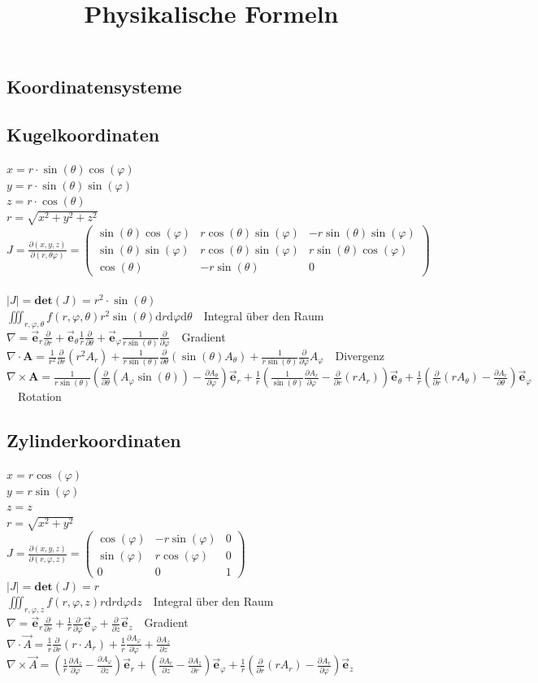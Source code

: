 \documentclass[8pt,a4paper]{extarticle}
\newcommand{\frml}[2]{$#1$~\hfill~#2\\}
\newcommand{\pder}[2]{\frac{\partial#1}{\partial#2}}
\newcommand{\unitv}[1]{\vec{\mathbf{e}}_{#1}}
\begin{document}
\raggedright
\begin{multicols}{3}
\title{Physikalische Formeln}
\section{Koordinatensysteme}
\subsection{Kugelkoordinaten}
\frml{x = r\cdot\sin(\theta)\cos(\varphi)}{}
\frml{y = r\cdot\sin(\theta)\sin(\varphi)}{}
\frml{z = r\cdot\cos(\theta)}{}
\frml{r = \sqrt{x^2+y^2+z^2}}{}
\frml{J = \frac{\partial(x,y,z)}{\partial(r,\theta\varphi)} =
	\begin{pmatrix}
		\sin(\theta)\cos(\varphi) & r\cos(\theta)\sin(\varphi) & -r\sin(\theta)\sin(\varphi) \\
		\sin(\theta)\sin(\varphi) & r\cos(\theta)\sin(\varphi) &  r\sin(\theta)\cos(\varphi) \\
		\cos(\theta) & -r\sin(\theta) & 0
	\end{pmatrix}
}{}
\frml{\left| J \right| = \mathbf{det}(J) = r^2\cdot\sin(\theta)}{}
\frml{\iiint_{r,\varphi,\theta}f(r,\varphi,\theta)r^2\sin(\theta)\mathrm{d}r\mathrm{d}\varphi\mathrm{d}\theta}{Integral \"uber den Raum}
\frml{\nabla = \unitv{r}\pder{}{r}+\unitv{\theta}\frac{1}{r}\pder{}{\theta}+\unitv{\varphi}\frac{1}{r\sin(\theta)}\pder{}{\varphi}}{Gradient}
\frml{\nabla \cdot \mathbf{A} = \frac{1}{r^2}\pder{}{r}(r^2A_r)+\frac{1}{r\sin(\theta)}\pder{}{\theta}(\sin(\theta)A_\theta)+\frac{1}{r\sin(\theta)}\pder{}{\varphi}A_\varphi}{Divergenz}
\frml{\nabla \times \mathbf{A} = \frac{1}{r\sin(\theta)}\left(\pder{}{\theta}(A_\varphi\sin(\theta))-\pder{A_\theta}{\varphi}\right)\unitv{r}+\frac{1}{r}\left(\frac{1}{\sin(\theta)}\pder{A_r}{\varphi}-\pder{}{r}\left(rA_r\right)\right)\unitv{\theta}+\frac{1}{r}\left(\pder{}{r}\left(rA_\theta\right)-\pder{A_r}{\theta}\right)\unitv{\varphi}}{Rotation}
\subsection{Zylinderkoordinaten}
\frml{x = r\cos(\varphi)}{}
\frml{y = r\sin(\varphi)}{}
\frml{z = z}{}
\frml{r = \sqrt{x^2+y^2}}{}
\frml{J = \pder{(x,y,z)}{(r,\varphi,z)} =
	\begin{pmatrix}
		\cos(\varphi) & -r\sin(\varphi) & 0 \\
		\sin(\varphi) & r\cos(\varphi) & 0 \\
		0 & 0 & 1
	\end{pmatrix}
	}{}
\frml{\left|J\right| = \mathbf{det}(J) = r}{}
\frml{\iiint_{r,\varphi,z}f(r,\varphi,z)r\mathrm{d}r\mathrm{d}\varphi\mathrm{d}z}{Integral \"uber den Raum}
\frml{\nabla = \unitv{r}\pder{}{r}+\frac{1}{r}\pder{}{\varphi}\unitv{\varphi}+\pder{}{z}\unitv{z}}{Gradient}
\frml{\nabla\cdot\vec{A}=\frac{1}{r}\pder{}{r}(r\cdot A_r)+\frac{1}{r}\pder{A_\varphi}{\varphi}+\pder{A_z}{z}}{}
\frml{\nabla\times\vec{A}=\left(\frac{1}{r}\pder{A_z}{\varphi}-\pder{A_\varphi}{z}\right)\unitv{r}+\left(\pder{A_r}{z}-\pder{A_z}{r}\right)\unitv{\varphi}+\frac{1}{r}\left(\pder{}{r}(rA_r)-\pder{A_r}{\varphi}\right)\unitv{z}}{}

\end{multicols}
\end{document}
